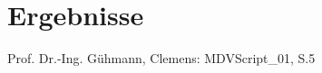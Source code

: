 
\section{Ergebnisse}
\begin{quote}
	
\end{quote}


\begin{thebibliography}{999}
 Prof. Dr.-Ing. Gühmann, Clemens: MDVScript\_01, S.5

\end{thebibliography}





